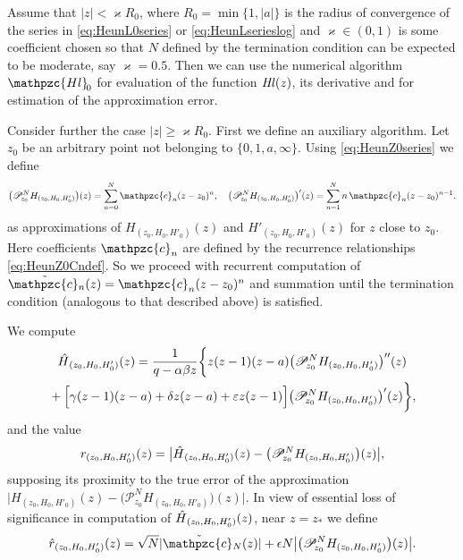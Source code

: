 \documentclass[11pt]{article}
\newcommand{\MF}[1]{\mathop{#1}\nolimits}
\def\Heun{H}%
\def\HeunL{\MF{\textit{Hl\/}}}%
\def\psHeunL{\mathpzc{Hl}_{\!0}}%
\def\reservecoeff{\varkappa}
\def\car{\mathpzc{c}}
\def\caz{\skew4\tilde{\car}}%
\begin{document}
Assume that $|z|<\reservecoeff R_0$, where $R_0=\min\{1,|a|\}$ is the radius of
convergence of the series in \eqref{eq:HeunL0series} or
\eqref{eq:HeunLserieslog} and $\reservecoeff\in(0,1)$ is some coefficient chosen
so that $N$ defined by the termination condition can be expected to be moderate,
say $\reservecoeff=0.5$. Then we can use the numerical algorithm $\psHeunL$ for
evaluation of the function $\HeunL(z)$, its derivative  and for estimation of
the approximation error.

Consider further the case $|z|\geq\reservecoeff R_0$. First we define an
auxiliary algorithm. Let $z_0$ be an arbitrary point not belonging to
$\{0,1,a,\infty\}$. Using \eqref{eq:HeunZ0series} we define
\[
\bigl(\mathscr{P}_{\!z_0}^N\Heun_{(z_0,H_0,H'_0)}\bigr)(z)=\sum_{n=0}^{N}\car_n(z-z_0)^n,\quad
\bigl(\mathscr{P}_{\!z_0}^N\Heun_{(z_0,H_0,H'_0)}\bigr)'(z)=\sum_{n=1}^{N}n\,\car_n(z-z_0)^{n-1}.
\]
as approximations of $\Heun_{(z_0,H_0,H'_0)}(z)$ and
$\Heun'_{(z_0,H_0,H'_0)}(z)$ for $z$ close to $z_0$. Here coefficients $\car_n$
are defined by the recurrence relationships \eqref{eq:HeunZ0Cndef}. So we
proceed with recurrent computation of $\caz_n(z)=\car_n (z-z_0)^n$ and summation
until the termination condition (analogous to that described above) is
satisfied.

We compute
\begin{multline*}
  \skew4\Hat{\Heun}_{(z_0,H_0,H'_0)}(z)=\frac{1}{q-\alpha\beta z}\biggl\{z(z-1)(z-a)\bigl(\mathscr{P}_{\!z_0}^N\Heun_{(z_0,H_0,H'_0)}\bigr)''(z)\\
  {}+
  \Bigl[\gamma(z-1)(z-a)+\delta z(z-a)+\varepsilon z(z-1)\Bigr]\bigl(\mathscr{P}_{\!z_0}^N
  \Heun_{(z_0,H_0,H'_0)}\bigr)'(z)\biggr\},
\end{multline*}
and the value
\begin{equation}
\MF{r_{(z_0,H_0,H'_0)}}(z)=\bigl|\skew4\Hat{\Heun}_{(z_0,H_0,H'_0)}(z)-
\bigl(\mathscr{P}_{\!z_0}^N\Heun_{(z_0,H_0,H'_0)}\bigr)(z)\bigr|,
\label{eq:errz0def}
\end{equation}
supposing its proximity to the true error of the approximation
$\bigl|\Heun_{(z_0,H_0,H'_0)}(z)-
\bigl(\mathscr{P}_{\!z_0}^N\Heun_{(z_0,H_0,H'_0)}\bigr)(z)\bigr|$. In view of
essential loss of significance in computation of
$\skew4\Hat{\Heun}_{(z_0,H_0,H'_0)}(z)$, near $z=z_*$ we define
\begin{equation}
\MF{\Hat{r}\vphantom{r}_{(z_0,H_0,H'_0)}}(z)=
\sqrt{N}|\caz_N(z)| + \epsilon N \bigl|\bigl(\mathscr{P}_{\!z_0}^N\Heun_{(z_0,H_0,H'_0)}\bigr)(z)\bigr|.
\label{eq:err2z0def}
\end{equation}
\end{document}
